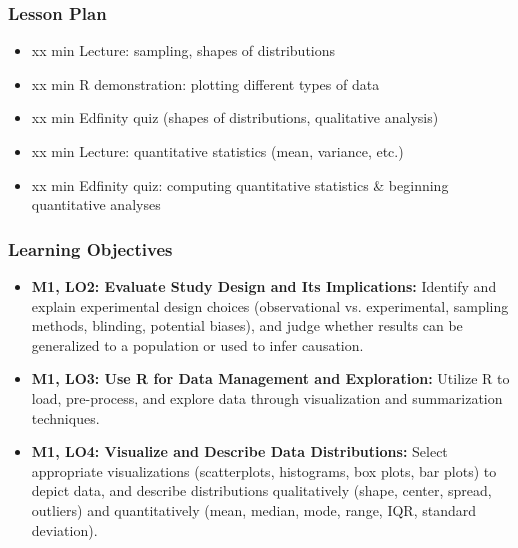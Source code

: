 \begin{frame}
    \frametitle{Lesson Plan}
    \begin{itemize}
        \item xx min Lecture: sampling, shapes of distributions
        \item xx min R demonstration: plotting different types of data
        \item xx min Edfinity quiz (shapes of distributions, qualitative analysis)
        \item xx min Lecture: quantitative statistics (mean, variance, etc.)
        \item xx min Edfinity quiz: computing quantitative statistics & beginning quantitative analyses
    \end{itemize}
\end{frame}
    
\begin{frame}
    \frametitle{Learning Objectives}
    \begin{itemize}
        \item \textbf{M1, LO2: Evaluate Study Design and Its Implications:} Identify and explain experimental design choices (observational vs. experimental, sampling methods, blinding, potential biases), and judge whether results can be generalized to a population or used to infer causation. 
        \item \textbf{M1, LO3: Use R for Data Management and Exploration:} Utilize R to load, pre-process, and explore data through visualization and summarization techniques.
        \item \textbf{M1, LO4: Visualize and Describe Data Distributions:} Select appropriate visualizations (scatterplots, histograms, box plots, bar plots) to depict data, and describe distributions qualitatively (shape, center, spread, outliers) and quantitatively (mean, median, mode, range, IQR, standard deviation).
    \end{itemize}
\end{frame}


